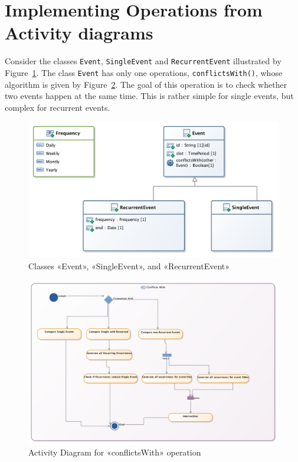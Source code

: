 \documentclass[a4paper,11pt]{memoir}
\newcommand{\code}[1]{\lstinline{#1}}
\begin{document}
\begin{solution}
			
\end{solution}


\section{Implementing Operations from Activity diagrams}

Consider the classes \code{Event}, \code{SingleEvent} and \code{RecurrentEvent} illustrated by Figure~\ref{fig:recurrent}.
The class \code{Event} has only one operations, \code{conflictsWith()}, whose algorithm is given by Figure~\ref{fig:conflicts}.
The goal of this operation is to check whether two events happen at the same time. 
This is rather simple for single events, but complex for recurrent events.


\begin{figure}[htbp]
	\centering
		\includegraphics[width=.8\linewidth]{cd-recurrent-event.png}
	\caption{Classes «Event», «SingleEvent», and «RecurrentEvent»}
	\label{fig:recurrent}
\end{figure}


\begin{figure}[htbp]
	\centering
		\includegraphics[width=\linewidth]{ad-conflicts.png}
	\caption{Activity Diagram for «conflictsWith» operation}
	\label{fig:conflicts}
\end{figure}
\end{document}
